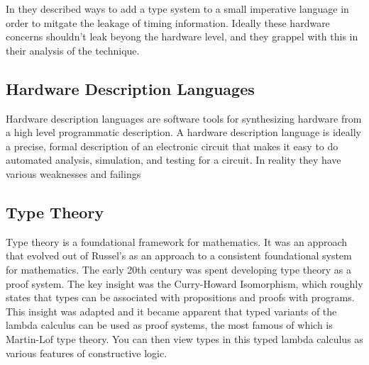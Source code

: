 \documentclass[12pt, titlepage]{article}
\begin{document}
\cite{blackboxed} \cite{languagebased} \cite{Chlipala:2007:CTC:1250734.1250742}



In \cite{languagebased} they described ways to add a type system to a small imperative language in order to mitgate the leakage of timing information.
Ideally these hardware concerns shouldn't leak beyong the hardware level, and they grappel with this in their analysis of the technique. 


\subsection{Hardware Description Languages}

Hardware description languages are software tools for synthesizing hardware from a high level programmatic description.
A hardware description language is ideally a precise, formal description of an electronic circuit that 
makes it easy to do automated analysis, simulation, and testing for a circuit. In reality they have
various weaknesses and failings \subsection{Type Theory}
Type theory is a foundational framework for mathematics. It was an approach that evolved out of Russel's \cite{Principia}
as an approach to a consistent foundational system for mathematics. The early 20th century was spent developing type theory
as a proof system. The key insight was the Curry-Howard Isomorphism, which roughly states that types can be associated with
propositions and proofs with programs. This insight was adapted and it became apparent that typed variants of the lambda
calculus can be used as proof systems, the most famous of which is Martin-Lof type theory. You can then view types in
this typed lambda calculus as various features of constructive logic.
\end{document}
